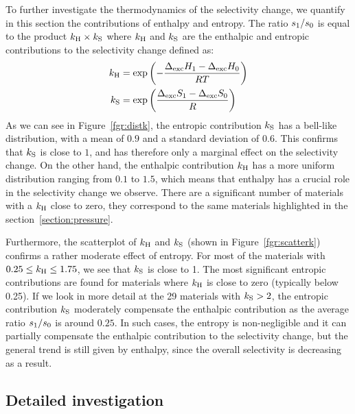 \documentclass[main.tex]{subfiles}
\begin{document}
To further investigate the thermodynamics of the selectivity change, we quantify in this section the contributions of enthalpy and entropy. The ratio ${s_{\text{1}}}/{s_{\text{0}}}$ is equal to the product $k_{\text{H}} \times k_{\text{S}}$ where $k_{\text{H}}$ and $k_{\text{S}}$ are the enthalpic and entropic contributions to the selectivity change defined as:
\begin{equation}
\label{eq:effects}
    \begin{split}
      k_{\text{H}} & = \exp\left(-\dfrac{\Delta_{\text{exc}}H_{\text{1}}-\Delta_{\text{exc}}H_{\text{0}}}{RT}\right) \\ k_{\text{S}} & = \exp\left(\dfrac{\Delta_{\text{exc}}S_{\text{1}}-\Delta_{\text{exc}}S_{\text{0}}}{R}\right)
    \end{split}
\end{equation}
As we can see in Figure~\ref{fgr:distk}, the entropic contribution $k_{\text{S}}$ has a bell-like distribution, with a mean of $0.9$ and a standard deviation of $0.6$. This confirms that $k_{\text{S}}$ is close to $1$, and has therefore only a marginal effect on the selectivity change. On the other hand, the enthalpic contribution $k_{\text{H}}$ has a more uniform distribution ranging from $0.1$ to $1.5$, which means that enthalpy has a crucial role in the selectivity change we observe. There are a significant number of materials with a $k_{\text{H}}$ close to zero, they correspond to the same materials highlighted in the section~\ref{section:pressure}.

Furthermore, the scatterplot of $k_{\text{H}}$ and $k_{\text{S}}$ (shown in Figure~\ref{fgr:scatterk}) confirms a rather moderate effect of entropy. For most of the materials with $0.25 \le k_{\text{H}} \le 1.75$, we see that $k_{\text{S}}$ is close to 1. The most significant entropic contributions are found for materials where $k_{\text{H}}$ is close to zero (typically below 0.25). If we look in more detail at the 29 materials with $k_{\text{S}}>2$, the entropic contribution $k_{\text{S}}$ moderately compensate the enthalpic contribution as the average ratio $s_{\text{1}}/s_{\text{0}}$ is around $0.25$. In such cases, the entropy is non-negligible and it can partially compensate the enthalpic contribution to the selectivity change, but the general trend is still given by enthalpy, since the overall selectivity is decreasing as a result.
  
\subsection{Detailed investigation}\label{sec:archetypes}
\end{document}
